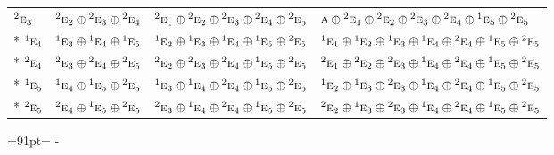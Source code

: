 \documentclass[10pt,a4paper]{article}
\newcommand{\needspace}[1]{\par\penalty-100\begingroup\dimen0=#1\relax\dimen2=\pagegoal
  \advance\dimen2-\pagetotal\ifdim\dimen0>\dimen2\relax\ifdim\dimen2>0pt\vfil\break\fi\fi
  \endgroup}
\numberwithin{equation}{section}
\newcommand{\irr}[1]{\text{\normalfont\scshape #1}}
\newcommand{\conjpair}[1]{{}^{#1}}
\begin{document}
{\begin{longtable}{@{}llll@{}}
$\conjpair{2}\irr{e}_{3}$ & $\conjpair{2}\irr{e}_{2}\oplus \conjpair{2}\irr{e}_{3}\oplus \conjpair{2}\irr{e}_{4}$ & $\conjpair{2}\irr{e}_{1}\oplus \conjpair{2}\irr{e}_{2}\oplus \conjpair{2}\irr{e}_{3}\oplus \conjpair{2}\irr{e}_{4}\oplus \conjpair{2}\irr{e}_{5}$ & $\irr{a}\oplus \conjpair{2}\irr{e}_{1}\oplus \conjpair{2}\irr{e}_{2}\oplus \conjpair{2}\irr{e}_{3}\oplus \conjpair{2}\irr{e}_{4}\oplus \conjpair{1}\irr{e}_{5}\oplus \conjpair{2}\irr{e}_{5}$\\*
$\conjpair{1}\irr{e}_{4}$ & $\conjpair{1}\irr{e}_{3}\oplus \conjpair{1}\irr{e}_{4}\oplus \conjpair{1}\irr{e}_{5}$ & $\conjpair{1}\irr{e}_{2}\oplus \conjpair{1}\irr{e}_{3}\oplus \conjpair{1}\irr{e}_{4}\oplus \conjpair{1}\irr{e}_{5}\oplus \conjpair{2}\irr{e}_{5}$ & $\conjpair{1}\irr{e}_{1}\oplus \conjpair{1}\irr{e}_{2}\oplus \conjpair{1}\irr{e}_{3}\oplus \conjpair{1}\irr{e}_{4}\oplus \conjpair{2}\irr{e}_{4}\oplus \conjpair{1}\irr{e}_{5}\oplus \conjpair{2}\irr{e}_{5}$\\*
$\conjpair{2}\irr{e}_{4}$ & $\conjpair{2}\irr{e}_{3}\oplus \conjpair{2}\irr{e}_{4}\oplus \conjpair{2}\irr{e}_{5}$ & $\conjpair{2}\irr{e}_{2}\oplus \conjpair{2}\irr{e}_{3}\oplus \conjpair{2}\irr{e}_{4}\oplus \conjpair{1}\irr{e}_{5}\oplus \conjpair{2}\irr{e}_{5}$ & $\conjpair{2}\irr{e}_{1}\oplus \conjpair{2}\irr{e}_{2}\oplus \conjpair{2}\irr{e}_{3}\oplus \conjpair{1}\irr{e}_{4}\oplus \conjpair{2}\irr{e}_{4}\oplus \conjpair{1}\irr{e}_{5}\oplus \conjpair{2}\irr{e}_{5}$\\*
$\conjpair{1}\irr{e}_{5}$ & $\conjpair{1}\irr{e}_{4}\oplus \conjpair{1}\irr{e}_{5}\oplus \conjpair{2}\irr{e}_{5}$ & $\conjpair{1}\irr{e}_{3}\oplus \conjpair{1}\irr{e}_{4}\oplus \conjpair{2}\irr{e}_{4}\oplus \conjpair{1}\irr{e}_{5}\oplus \conjpair{2}\irr{e}_{5}$ & $\conjpair{1}\irr{e}_{2}\oplus \conjpair{1}\irr{e}_{3}\oplus \conjpair{2}\irr{e}_{3}\oplus \conjpair{1}\irr{e}_{4}\oplus \conjpair{2}\irr{e}_{4}\oplus \conjpair{1}\irr{e}_{5}\oplus \conjpair{2}\irr{e}_{5}$\\*
$\conjpair{2}\irr{e}_{5}$ & $\conjpair{2}\irr{e}_{4}\oplus \conjpair{1}\irr{e}_{5}\oplus \conjpair{2}\irr{e}_{5}$ & $\conjpair{2}\irr{e}_{3}\oplus \conjpair{1}\irr{e}_{4}\oplus \conjpair{2}\irr{e}_{4}\oplus \conjpair{1}\irr{e}_{5}\oplus \conjpair{2}\irr{e}_{5}$ & $\conjpair{2}\irr{e}_{2}\oplus \conjpair{1}\irr{e}_{3}\oplus \conjpair{2}\irr{e}_{3}\oplus \conjpair{1}\irr{e}_{4}\oplus \conjpair{2}\irr{e}_{4}\oplus \conjpair{1}\irr{e}_{5}\oplus \conjpair{2}\irr{e}_{5}$\\
\bottomrule\end{longtable}}
\needspace{91pt}
\end{document}
